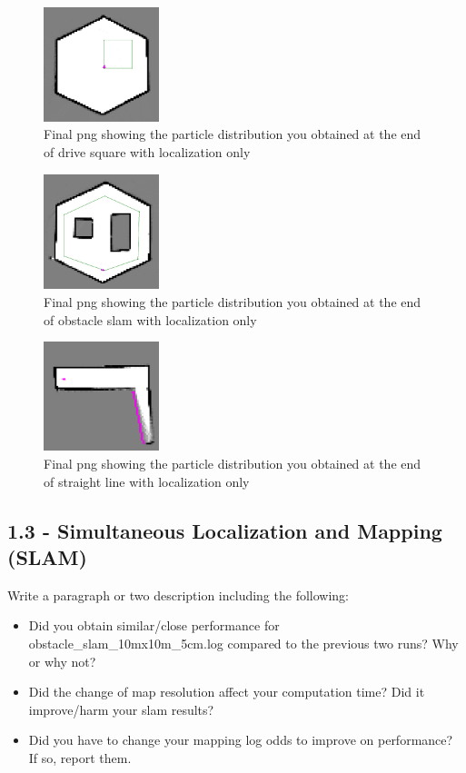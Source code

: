 \documentclass[journal,onecolumn]{IEEEtran}
\begin{document}
\begin{figure}[H]
\centering
\includegraphics[width=0.3\textwidth]{Media/1221.png}
\caption{Final png showing the particle distribution you obtained at the end of drive square with localization only}
\end{figure}

\begin{figure}[H]
\centering
\includegraphics[width=0.3\textwidth]{Media/1222.png}
\caption{Final png showing the particle distribution you obtained at the end of obstacle slam with localization only}
\end{figure}


\begin{figure}[H]
\centering
\includegraphics[width=0.3\textwidth]{Media/1223.png}
\caption{Final png showing the particle distribution you obtained at the end of straight line with localization only}
\end{figure}

\subsection*{1.3 - Simultaneous Localization and Mapping (SLAM)} 

 Write a paragraph or two description including the following:
 \begin{itemize}
    \item Did you obtain similar/close performance for obstacle\_slam\_10mx10m\_5cm.log compared to the previous two runs? Why or why not?
    \item Did the change of map resolution affect your computation time? Did it improve/harm your slam results?
    \item Did you have to change your mapping log odds to improve on performance? If so, report them.
\end{itemize}
\end{document}

